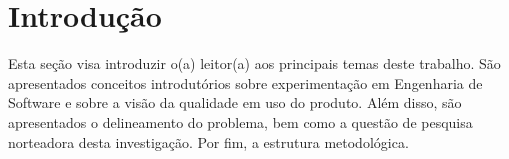 \chapter{Introdução}   
\label{ch:intro}

Esta seção visa introduzir o(a) leitor(a) aos principais temas deste trabalho. São apresentados conceitos introdutórios sobre experimentação em Engenharia de Software e sobre a visão da qualidade em uso do produto. Além disso, são apresentados o delineamento do problema, bem como a questão de pesquisa norteadora desta investigação. Por fim, a estrutura metodológica.













